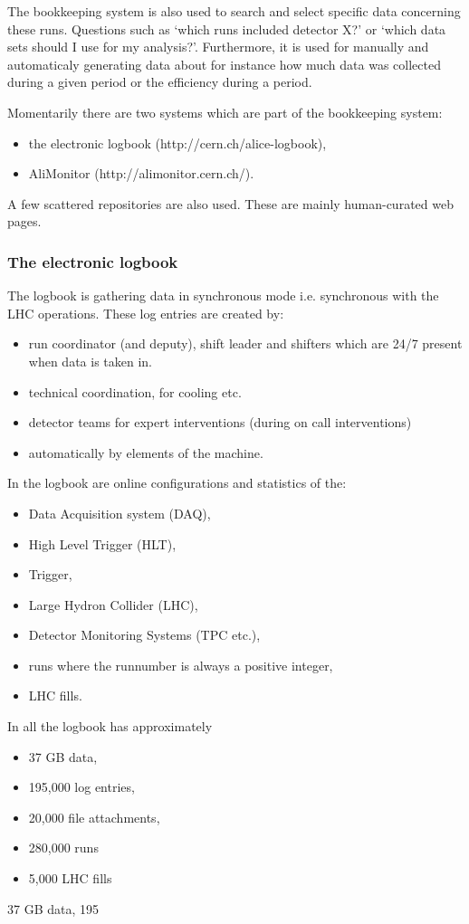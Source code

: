 The bookkeeping system is also used to search and select specific data concerning these runs. Questions such as `which runs included detector X?' or `which data sets should I use for my analysis?'. Furthermore, it is used for manually and automaticaly generating data about for instance how much data was collected during a given period or the efficiency during a period.

Momentarily there are two systems which are part of the bookkeeping system:
\begin{itemize}
  \item the electronic logbook (http://cern.ch/alice-logbook),
  \item AliMonitor (http://alimonitor.cern.ch/).
\end{itemize}
A few scattered repositories are also used. These are mainly human-curated web pages.


\subsubsection{The electronic logbook}
The logbook is gathering data in synchronous mode i.e. synchronous with the LHC operations. These log entries are created by:
\begin{itemize}
  \item run coordinator (and deputy), shift leader and shifters which are 24/7 present when data is taken in.
  \item technical coordination, for cooling etc.
  \item detector teams for expert interventions (during on call interventions)
  \item automatically by elements of the machine.
\end{itemize}

In the logbook are online configurations and statistics of the:
\begin{itemize}
  \item Data Acquisition system (DAQ),
  \item High Level Trigger (HLT),
  \item Trigger,
  \item Large Hydron Collider (LHC),
  \item Detector Monitoring Systems (TPC etc.),
  \item runs where the runnumber is always a positive integer,
  \item LHC fills.
\end{itemize}

In all the logbook has approximately
\begin{itemize}
  \item 37 GB data,
  \item 195,000 log entries,
  \item 20,000 file attachments,
  \item 280,000 runs
  \item 5,000 LHC fills
\end{itemize} 37 GB data, 195

